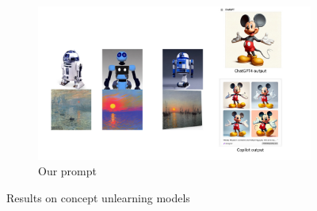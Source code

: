 \begin{figure}[t]
\begin{minipage}[b]{0.60\textwidth}
\begin{subfigure}[t]{0.32\linewidth}
            \includegraphics[width=\linewidth]{figure_folder/unlearning_fig_ours.pdf}
            \vspace{-0.2in}
            \caption{\small Our prompt}
            \label{figc:unlearn_ours}
        \end{subfigure}
        \vspace{-0.01in}
        \caption{\small Results on concept unlearning models}
        \label{fig:unlearning_model}
    \end{minipage}
\vspace{-0.23in}
\end{figure}
